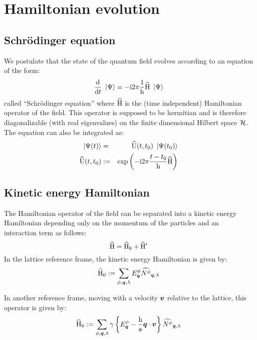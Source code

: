 \chapter{Hamiltonian evolution}
\label{Hamiltonian evolution}

\section{Schrödinger equation}
\label{Schrödinger equation}

We postulate that the state of the quantum field evolves according to an equation of the form:
\begin{equation*}
\frac{\mathrm d}{\mathrm dt} \ \left|{\Psi}\right\rangle = -\mathrm{i} 2 \pi \frac 1 {\mathrm h} \widehat{\mathrm H} \ \left|{\Psi}\right\rangle
\end{equation*}
called ``Schrödinger equation'' where $\widehat{\mathrm H}$ is the (time independent) Hamiltonian operator of the field.
This operator is supposed to be hermitian and is therefore diagonalizable (with real eigenvalues) on the finite dimensional Hilbert space $\mathcal H$.
The equation can also be integrated as:
\begin{eqnarray*}
\ \left|{\Psi(t)}\right\rangle & = & \widehat{\mathrm U}({t},{t_0}) \ \left|{\Psi(t_0)}\right\rangle \\
\widehat{\mathrm U}({t},{t_0}) & := & \mathrm{exp} \left( {- \mathrm{i} 2 \pi \frac{t - t_0} {\mathrm h} \widehat{\mathrm H}} \right)
\end{eqnarray*}

\section{Kinetic energy Hamiltonian}
\label{Kinetic energy Hamiltonian}

The Hamiltonian operator of the field can be separated into a kinetic energy Hamiltonian depending only on the momentum of the particles and an interaction term as follows:
\begin{equation*}
\widehat{\mathrm H} = \widehat{\mathrm H}_0 + \widehat{\mathrm H}'
\end{equation*}
In the lattice reference frame, the kinetic energy Hamiltonian is given by:
\begin{equation*}
\widehat{\mathrm H}_0 := \sum_{\phi,\boldsymbol{q},\lambda} E^{\phi}_{\boldsymbol{q}} \widehat{N^{\phi}}_{{\boldsymbol{q}}, {\lambda}}
\end{equation*}

In another reference frame, moving with a velocity $\boldsymbol{v}$ relative to the lattice, this operator is given by:
\begin{equation*}
\widehat{\mathrm H}_0 := \sum_{\phi,\boldsymbol{q},\lambda} \gamma \left\{ E^{\phi}_{\boldsymbol{q}} - \frac {\mathrm h} {\mathrm a} \boldsymbol{q} \cdot \boldsymbol{v} \right\} \widehat{N^{\phi}}_{{\boldsymbol{q}}, {\lambda}}
\end{equation*}


